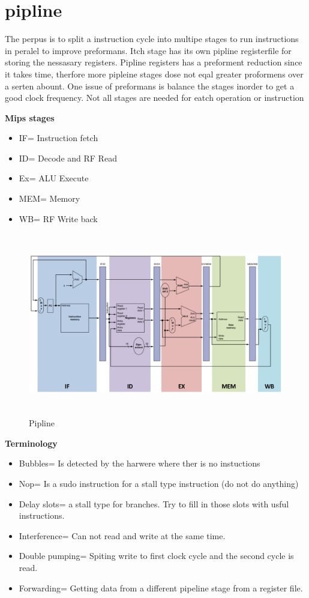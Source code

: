 \newpage


\section{pipline}
The perpus is to split a instruction cycle into multipe stages to run instructions in peralel to
improve preformans. Itch stage has its own pipline registerfile for storing the nessasary registers.
Pipline registers has a preforment reduction since it takes time, therfore more pipleine stages dose
not eqal greater proformens over a serten abount. One issue of preformans is balance the stages
inorder to get a good clock frequency. 
Not all stages are needed for eatch operation or instruction

\textbf{Mips stages}
\begin{itemize}
\item  IF= Instruction fetch
\item  ID= Decode and RF Read
\item  Ex= ALU Execute
\item  MEM= Memory
\item  WB= RF Write back
\end{itemize}

\begin{figure}[h]
    \vspace{10mm}
    \centering
    \includegraphics[width=16cm, height=8cm]{image/pipline.png} 
    \caption{Pipline}
    \label{pipline}
\end{figure}


\textbf{Terminology}
\begin{itemize}
\item  Bubbles= Is detected by the harwere where ther is no instuctions
\item  Nop= Is a sudo instruction for a stall type instruction (do not do anything)
\item  Delay slots= a stall type for branches. Try to fill in those slots with usful instructions.
\item  Interference= Can not read and write at the same time.
\item  Double pumping= Spiting write to first clock cycle and the second cycle is read.
\item  Forwarding= Getting data from a different pipeline stage from a register file.
\end{itemize}

